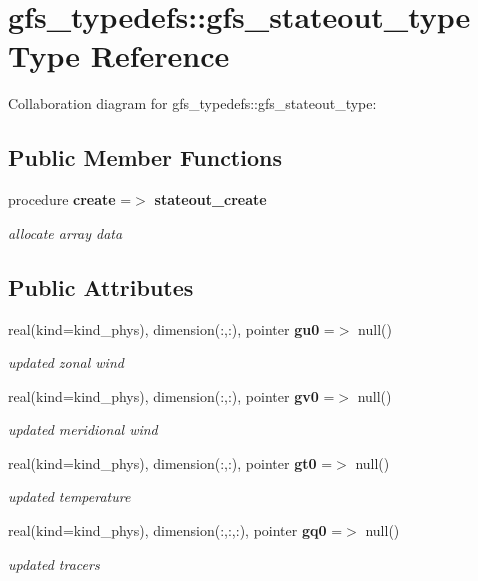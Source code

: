 \section{gfs\+\_\+typedefs\+:\+:gfs\+\_\+stateout\+\_\+type Type Reference}
\label{structgfs__typedefs_1_1gfs__stateout__type}


Collaboration diagram for gfs\+\_\+typedefs\+:\+:gfs\+\_\+stateout\+\_\+type\+:
\subsection*{Public Member Functions}
\begin{DoxyCompactItemize}
\item 
procedure \textbf{ create} =$>$ \textbf{ stateout\+\_\+create}
\begin{DoxyCompactList}\small\item\em allocate array data \end{DoxyCompactList}\end{DoxyCompactItemize}
\subsection*{Public Attributes}
\begin{DoxyCompactItemize}
\item 
real(kind=kind\+\_\+phys), dimension(\+:,\+:), pointer \textbf{ gu0} =$>$ null()
\begin{DoxyCompactList}\small\item\em updated zonal wind \end{DoxyCompactList}\item 
real(kind=kind\+\_\+phys), dimension(\+:,\+:), pointer \textbf{ gv0} =$>$ null()
\begin{DoxyCompactList}\small\item\em updated meridional wind \end{DoxyCompactList}\item 
real(kind=kind\+\_\+phys), dimension(\+:,\+:), pointer \textbf{ gt0} =$>$ null()
\begin{DoxyCompactList}\small\item\em updated temperature \end{DoxyCompactList}\item 
real(kind=kind\+\_\+phys), dimension(\+:,\+:,\+:), pointer \textbf{ gq0} =$>$ null()
\begin{DoxyCompactList}\small\item\em updated tracers \end{DoxyCompactList}\end{DoxyCompactItemize}


